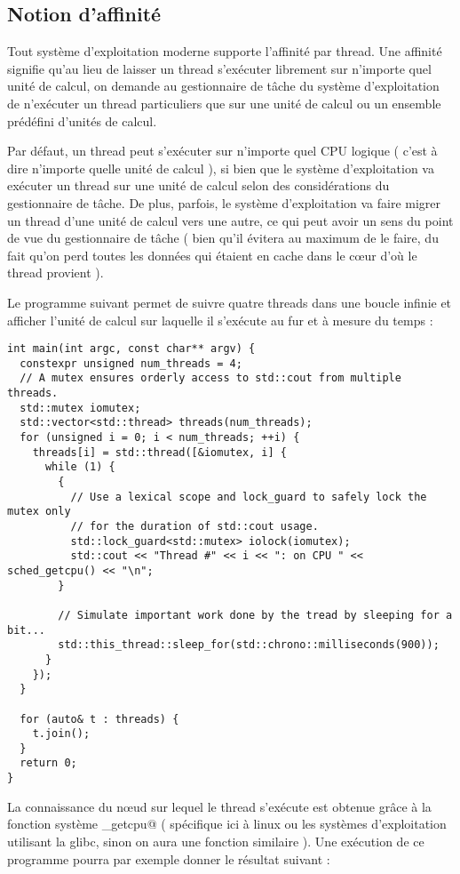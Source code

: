 \documentclass[fleqn,11pt]{article}
\begin{document}
\subsection{Notion d'affinité}

Tout système d'exploitation moderne supporte l'affinité par thread. Une affinité signifie qu'au lieu de laisser un thread s'exécuter
librement sur n'importe quel unité de calcul, on demande au gestionnaire de tâche du système d'exploitation de n'exécuter un
thread particuliers que sur une unité de calcul ou un ensemble prédéfini d'unités de calcul.

Par défaut, un thread peut s'exécuter sur n'importe quel CPU logique ( c'est à dire n'importe quelle unité de calcul ), si bien que
le système d'exploitation va exécuter un thread sur une unité de calcul selon des considérations du gestionnaire de tâche. De plus,
parfois, le système d'exploitation va faire migrer un thread d'une unité de calcul vers une autre, ce qui peut avoir un sens
du point de vue du gestionnaire de tâche ( bien qu'il évitera au maximum de le faire, du fait qu'on perd toutes les données qui
étaient en cache dans le c{\oe}ur d'où le thread provient ).

Le programme suivant permet de suivre quatre threads
dans une boucle infinie et afficher l'unité de calcul sur laquelle il s'exécute au fur et à mesure du temps :
\begin{lstlisting}
int main(int argc, const char** argv) {
  constexpr unsigned num_threads = 4;
  // A mutex ensures orderly access to std::cout from multiple threads.
  std::mutex iomutex;
  std::vector<std::thread> threads(num_threads);
  for (unsigned i = 0; i < num_threads; ++i) {
    threads[i] = std::thread([&iomutex, i] {
      while (1) {
        {
          // Use a lexical scope and lock_guard to safely lock the mutex only
          // for the duration of std::cout usage.
          std::lock_guard<std::mutex> iolock(iomutex);
          std::cout << "Thread #" << i << ": on CPU " << sched_getcpu() << "\n";
        }

        // Simulate important work done by the tread by sleeping for a bit...
        std::this_thread::sleep_for(std::chrono::milliseconds(900));
      }
    });
  }

  for (auto& t : threads) {
    t.join();
  }
  return 0;
}
\end{lstlisting}

La connaissance du n{\oe}ud sur lequel le thread s'exécute est obtenue grâce à la fonction système \lstinline@sched_getcpu@
( spécifique ici à linux ou les systèmes d'exploitation utilisant la glibc, sinon on aura une fonction similaire ). Une exécution
de ce programme pourra par exemple donner le résultat suivant :
\end{document}
